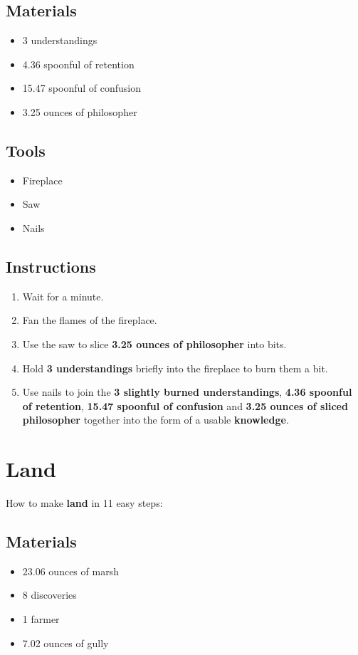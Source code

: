 \documentclass{article}
\begin{document}
\subsection{Materials}\begin{itemize}
\item 
3 understandings
\item 
4.36 spoonful of retention
\item 
15.47 spoonful of confusion
\item 
3.25 ounces of philosopher
\end{itemize}
\subsection{Tools}\begin{itemize}
\item 
Fireplace
\item 
Saw
\item 
Nails
\end{itemize}
\subsection{Instructions}\begin{enumerate}
\item 
Wait for a minute.
\item 
Fan the flames of the fireplace.
\item 
Use the saw to slice \textbf{3.25 ounces of philosopher} into bits.
\item 
Hold \textbf{3 understandings} briefly into the fireplace to burn them a bit.
\item 
Use nails to join the \textbf{3 slightly burned understandings}, \textbf{4.36 spoonful of retention}, \textbf{15.47 spoonful of confusion} and \textbf{3.25 ounces of sliced philosopher} together into the form of a usable \textbf{knowledge}.
\end{enumerate}
\newpage
\section{Land}How to make \textbf{land} in 11 easy steps:

\subsection{Materials}\begin{itemize}
\item 
23.06 ounces of marsh
\item 
8 discoveries
\item 
1 farmer
\item 
7.02 ounces of gully
\end{itemize}
\end{document}
